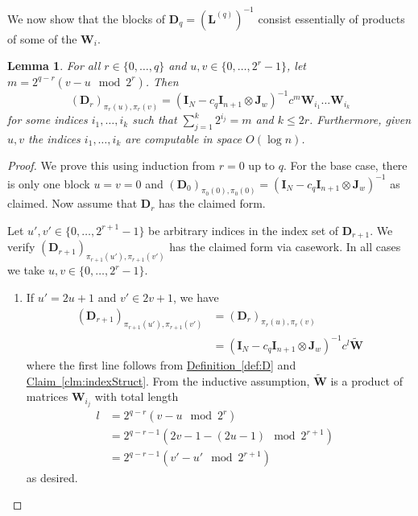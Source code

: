 \documentclass[11pt]{article}
\numberwithin{equation}{section}
\newtheorem{lemma}[theorem]{Lemma}
\theoremstyle{definition}
\theoremstyle{plain}
\newcommand{\expref}[2]{\hyperref[#2]{#1~\ref{#2}}}
\newcommand{\mD}{\mathbf{D}}
\newcommand{\mW}{\mathbf{W}}
\newcommand{\I}{\mathbf{I}}
\newcommand{\Jw}{\mathbf{J}_w}
\newcommand{\Lq}{\mathbf{L}^{(q)}}
\begin{document}
We now show that the blocks of $\mD_q=(\Lq)^{-1}$ consist essentially of products of
%
some of the $\mW_i$.  %
\begin{lemma}\label{lem:labelstruct}
For all $r \in \{0,\ldots,q\}$ and $u,v\in \{0,\ldots,2^{r}-1\}$, let $m=2^{q-r}(v-u \mod 2^{r})$. Then
$$(\mD_r)_{\pi_{r}(u),\pi_{r}(v)}=(\I_N-c_q\I_{n+1}\otimes\Jw)^{-1}c^{m}\mW_{i_1}\dots \mW_{i_k}$$
for some indices $i_1,\dots,i_k$ such that $\sum_{j=1}^k 2^{i_j}=m$ and $k\leq 2r$. Furthermore, given $u,v$ the indices $i_1,\ldots,i_k$ are computable in space $O(\log n)$.
\end{lemma}
\begin{proof}
We prove this using induction from $r=0$ up to $q$. For the base case, there is only one block $u=v=0$ and $(\mD_{0})_{\pi_0(0),\pi_0(0)}=(\I_N-c_q\I_{n+1}\otimes\Jw)^{-1}$ as claimed.
Now assume that $\mD_{r}$ has the claimed form.

Let $u',v'\in \{0,\ldots,2^{r+1}-1\}$ be arbitrary indices in the index set of $\mD_{r+1}$. We verify $(\mD_{r+1})_{\pi_{r+1}(u'),\pi_{r+1}(v')}$ has the claimed form via casework. In all cases we take $u,v\in \{0,\ldots,2^r-1\}$.

\begin{enumerate}
    \item If $u'=2u+1$ and $v'\in 2v+1$, we have
    \begin{align*}
        (\mD_{r+1})_{\pi_{r+1}(u'),\pi_{r+1}(v')} &= (\mD_{r})_{\pi_r(u),\pi_r(v)}\\
        &= (\I_N-c_q\I_{n+1}\otimes\Jw)^{-1}c^{l}\widetilde{\mW}
    \end{align*}
    where the first line follows from \expref{Definition}{def:D} and \expref{Claim}{clm:indexStruct}. From the inductive assumption, $\widetilde{\mW}$ is a product of matrices $\mW_{i_j}$ with total length
    \begin{align*}
        l &=2^{q-r}(v-u \mod 2^{r})&\\
        &=2^{q-r-1}(2v-1-(2u-1) \mod 2^{r+1})\\
        &=2^{q-r-1}(v'-u' \mod 2^{r+1})
    \end{align*} 
    as desired.
    

\end{enumerate}
\end{proof}
\end{document}
